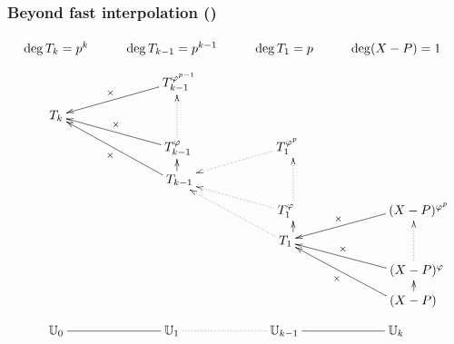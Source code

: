 \documentclass[10pt]{beamer}
\newcommand{\U}{\mathbb{U}}  %
\newcommand{\frob}{\varphi}  %
\newcommand{\0}{\mathcal{O}}  %
\begin{document}
\begin{frame}
  \frametitle{Beyond fast interpolation (\cite{DF07})}
  
  \footnotesize
  \[\xymatrix@R=8pt{
    \deg T_k=p^k & \deg T_{k-1} = p^{k-1} & \deg T_1 = p & \deg (X - P) = 1
    \\
    & **[r]T_{k-1}^{\frob^{p-1}}\ar[dl]_-\times \\
    T_k &  \\
    & **[r]T_{k-1}^{\frob}\ar[ul]_-\times \ar@<-4pt>@{.>}[uu] & **[r]T_1^{\frob^p}\ar@{.>}[dl]\\
    & **[r]T_{k-1}\ar[uul]^-\times \ar@<-4pt>[u] & \\
    & & **[r]T_1^{\frob}\ar@{.>}[ul] \ar@<-7pt>@{.>}[uu] & **[r](X-P)^{\frob^p}\ar[dl]_-\times \\
    & & **[r]T_1\ar@{.>}[uul] \ar@<-7pt>[u] &  \\
    & & & **[r](X-P)^{\frob}\ar[ul]_-\times \ar@<-14pt>@{.>}[uu] \\
    & & & **[r](X-P)\ar[uul]^-\times \ar@<-14pt>[u]
    \\
      {\U_0 \ar@{-}[r]} & {\U_1 \ar@{.}[r]} &
      {\U_{k-1} \ar@{-}[r]} & {\U_k}
  }\]
\end{frame}

\end{document}
